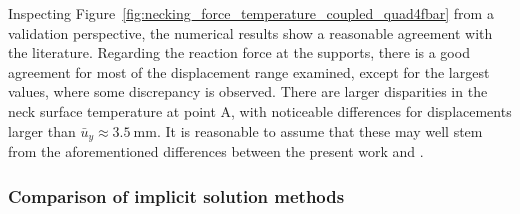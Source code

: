      Inspecting Figure~\ref{fig:necking_force_temperature_coupled_quad4fbar} from a validation perspective, the numerical results show a reasonable agreement with the literature.
     Regarding the reaction force at the supports, there is a good agreement for most of the displacement range examined, except for the largest values, where some discrepancy is observed.
     There are larger disparities in the neck surface temperature at point A, with noticeable differences for displacements larger than \(\bar{u}_y\approx\SI{3.5}{\milli\meter}\).
     It is reasonable to assume that these may well stem from the aforementioned differences between the present work and \cite{simo_associative_1992}.

     \subsubsection{Comparison of implicit solution methods}

